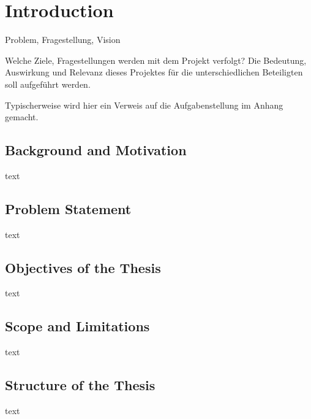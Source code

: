 \chapter{Introduction}
\label{ch:Introduction}
Problem, Fragestellung, Vision

Welche Ziele, Fragestellungen werden mit dem Projekt verfolgt? Die Bedeutung, Auswirkung und Relevanz dieses Projektes für die unterschiedlichen Beteiligten soll aufgeführt werden.

Typischerweise wird hier ein Verweis auf die Aufgabenstellung im Anhang gemacht.

\section{Background and Motivation}
\label{sec:BackgroundMotivation}
text \par
\vspace{\baselineskip}
\noindent

\section{Problem Statement}
\label{sec:ProblemStatement}
text \par
\vspace{\baselineskip}
\noindent

\section{Objectives of the Thesis}
\label{sec:Objectives}
text \par
\vspace{\baselineskip}
\noindent

\section{Scope and Limitations}
\label{sec:ScopeLimitations}
text \par
\vspace{\baselineskip}
\noindent

\section{Structure of the Thesis}
\label{sec:Structure}
text \par
\vspace{\baselineskip}
\noindent
